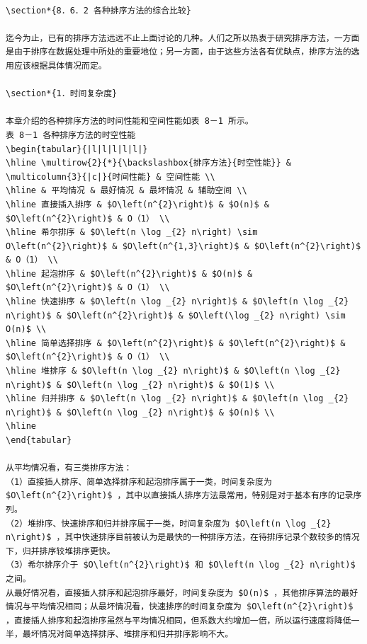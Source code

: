 \documentclass[10pt]{article}
\begin{document}
\begin{verbatim}

\section*{8．6．2 各种排序方法的综合比较}

迄今为止，已有的排序方法远远不止上面讨论的几种。人们之所以热衷于研究排序方法，一方面是由于排序在数据处理中所处的重要地位；另一方面，由于这些方法各有优缺点，排序方法的选用应该根据具体情况而定。

\section*{1．时间复杂度}

本章介绍的各种排序方法的时间性能和空间性能如表 8－1 所示。
表 8－1 各种排序方法的时空性能
\begin{tabular}{|l|l|l|l|l|}
\hline \multirow{2}{*}{\backslashbox{排序方法}{时空性能}} & \multicolumn{3}{|c|}{时间性能} & 空间性能 \\
\hline & 平均情况 & 最好情况 & 最坏情况 & 辅助空间 \\
\hline 直接插入排序 & $O\left(n^{2}\right)$ & $O(n)$ & $O\left(n^{2}\right)$ & O（1） \\
\hline 希尔排序 & $O\left(n \log _{2} n\right) \sim O\left(n^{2}\right)$ & $O\left(n^{1,3}\right)$ & $O\left(n^{2}\right)$ & O（1） \\
\hline 起泡排序 & $O\left(n^{2}\right)$ & $O(n)$ & $O\left(n^{2}\right)$ & O（1） \\
\hline 快速排序 & $O\left(n \log _{2} n\right)$ & $O\left(n \log _{2} n\right)$ & $O\left(n^{2}\right)$ & $O\left(\log _{2} n\right) \sim O(n)$ \\
\hline 简单选择排序 & $O\left(n^{2}\right)$ & $O\left(n^{2}\right)$ & $O\left(n^{2}\right)$ & O（1） \\
\hline 堆排序 & $O\left(n \log _{2} n\right)$ & $O\left(n \log _{2} n\right)$ & $O\left(n \log _{2} n\right)$ & $O(1)$ \\
\hline 归并排序 & $O\left(n \log _{2} n\right)$ & $O\left(n \log _{2} n\right)$ & $O\left(n \log _{2} n\right)$ & $O(n)$ \\
\hline
\end{tabular}

从平均情况看，有三类排序方法：
（1）直接插人排序、简单选择排序和起泡排序属于一类，时间复杂度为 $O\left(n^{2}\right)$ ，其中以直接插人排序方法最常用，特别是对于基本有序的记录序列。
（2）堆排序、快速排序和归并排序属于一类，时间复杂度为 $O\left(n \log _{2} n\right)$ ，其中快速排序目前被认为是最快的一种排序方法，在待排序记录个数较多的情况下，归并排序较堆排序更快。
（3）希尔排序介于 $O\left(n^{2}\right)$ 和 $O\left(n \log _{2} n\right)$ 之间。
从最好情况看，直接插人排序和起泡排序最好，时间复杂度为 $O(n)$ ，其他排序算法的最好情况与平均情况相同；从最坏情况看，快速排序的时间复杂度为 $O\left(n^{2}\right)$ ，直接插人排序和起泡排序虽然与平均情况相同，但系数大约增加一倍，所以运行速度将降低一半，最坏情况对简单选择排序、堆排序和归并排序影响不大。


\end{verbatim}
\end{document}
